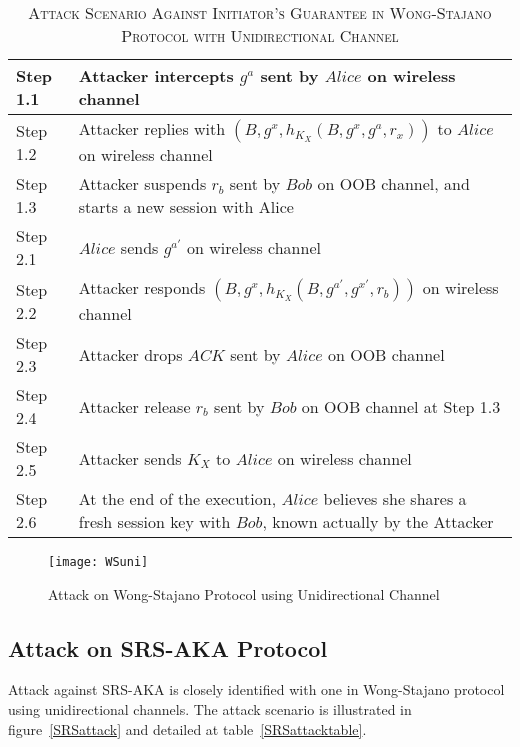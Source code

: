 \begin{table}[t]
\centering
\caption{\textsc{Attack Scenario Against Initiator's Guarantee in Wong-Stajano Protocol with Unidirectional Channel}}
\label{WSuniattack}
{\small
\begin{tabular}{| l | p{11cm} |}
 \hline
 Step 1.1 & Attacker intercepts $g^{a}$ sent by $Alice$ on wireless channel\\ \hline
 Step 1.2 & Attacker replies with $(B, g^{x}, h_{K_X}(B,g^{x},g^a,r_x))$ to $Alice$ on wireless channel\\ \hline
 Step 1.3 & Attacker suspends $r_b$ sent by $Bob$ on OOB channel, and starts a new session with Alice\\ \hline \hline
 Step 2.1 & $Alice$ sends $g^{a'}$ on wireless channel\\ \hline
 Step 2.2 & Attacker responds $(B, g^{x}, h_{K_X}(B,g^{a'},g^{x'},r_b))$ on wireless channel\\ \hline
 Step 2.3 & Attacker drops $ACK$ sent by $Alice$ on OOB channel\\ \hline
 Step 2.4 & Attacker release $r_b$ sent by $Bob$ on OOB channel at Step 1.3\\ \hline
 Step 2.5 & Attacker sends $K_X$ to $Alice$ on wireless channel\\ \hline
 Step 2.6 & At the end of the execution, $Alice$ believes she shares a fresh session key with $Bob$, known actually by the Attacker\\ \hline
\end{tabular}
}
\end{table}

\begin{figure}
  \centering
  \texttt{[image: WSuni]}
  \caption{Attack on Wong-Stajano Protocol using Unidirectional Channel}
  \label{WSuniattack}
\end{figure}

\subsection{Attack on SRS-AKA Protocol}

Attack against SRS-AKA is closely identified with one in Wong-Stajano protocol using unidirectional channels. The attack scenario is illustrated in figure~\ref{SRSattack} and detailed at table~\ref{SRSattacktable}.

